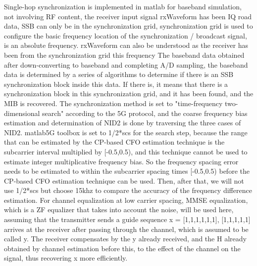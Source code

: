 \documentclass[english]{cccconf}
\begin{document}
{Single-hop synchronization is implemented in matlab for baseband simulation, not involving RF content, the receiver input signal rxWaveform has been IQ road data, SSB can only be in the synchronization grid, synchronization grid is used to configure the basic frequency location of the synchronization / broadcast signal, is an absolute frequency. rxWaveform can also be understood as the receiver has been from the synchronization grid this frequency The baseband data obtained after down-converting to baseband and completing A/D sampling, the baseband data is determined by a series of algorithms to determine if there is an SSB synchronization block inside this data. If there is, it means that there is a synchronization block in this synchronization grid, and it has been found, and the MIB is recovered. The synchronization method is set to "time-frequency two-dimensional search" according to the 5G protocol, and the coarse frequency bias estimation and determination of NID2 is done by traversing the three cases of NID2. matlab5G toolbox is set to 1/2*scs for the search step, because the range that can be estimated by the CP-based CFO estimation technique is the subcarrier interval multiplied by [-0.5,0.5), and this technique cannot be used to estimate integer multiplicative frequency bias. So the frequency spacing error needs to be estimated to within the subcarrier spacing times [-0.5,0.5) before the CP-based CFO estimation technique can be used.
Then, after that, we will not use 1/2*scs but choose 15khz to compare the accuracy of the frequency difference estimation.
For channel equalization at low carrier spacing, MMSE equalization, which is a ZF equalizer that takes into account the noise, will be used here, assuming that the transmitter sends a guide sequence x = [1,1,1,1,1,1], [1,1,1,1,1] arrives at the receiver after passing through the channel, which is assumed to be called y. The receiver compensates by the y already received, and the H already obtained by channel estimation before this, to the effect of the channel on the signal, thus recovering x more efficiently.

}
\end{document}
